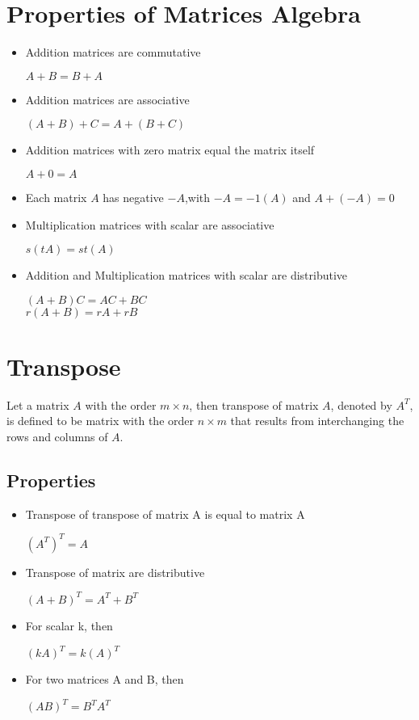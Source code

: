 \documentclass[a4paper,12pt]{article}
\begin{document}
\section*{Properties of Matrices Algebra}
\begin{itemize}
  \item Addition matrices are commutative
        \begin{center}
          \(A+B=B+A\)
        \end{center}
  \item Addition matrices are associative
        \begin{center}
          \((A+B)+C=A+(B+C)\)
        \end{center}
  \item Addition matrices with zero matrix equal the matrix itself
        \begin{center}
          \(A+0=A\)
        \end{center}
  \item Each matrix \(A\) has negative \(-A\),with \(-A=-1(A)\) and \(A+(-A)=0\)
  \item Multiplication matrices with scalar are associative
        \begin{center}
          \(s(tA)=st(A)\)
        \end{center}
  \item Addition and Multiplication matrices with scalar are distributive
        \begin{center}
          \((A+B)C=AC+BC\) \\ \(r(A+B)=rA+rB\)
        \end{center}
\end{itemize}

\section*{Transpose}
Let a matrix \(A\) with the order \(m\times n\), then transpose of matrix \(A\), denoted by \(A^T\), is defined to be matrix with the order \(n\times m\) that results from interchanging the rows and columns of \(A\).
\subsection*{Properties}
\begin{itemize}
  \item Transpose of transpose of matrix A is equal to matrix A
        \begin{center}
          \((A^T)^T=A\)
        \end{center}
  \item Transpose of matrix are distributive
        \begin{center}
          \((A+B)^T=A^T+B^T\)
        \end{center}
  \item For scalar k, then
        \begin{center}
          \((kA)^T=k(A)^T\)
        \end{center}
  \item For two matrices A and B, then
        \begin{center}
          \((AB)^T=B^TA^T\)
        \end{center}
\end{itemize}
\end{document}
